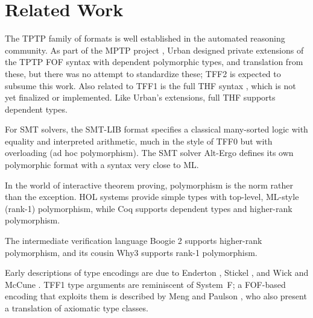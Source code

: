 \section{Related Work}
\label{sec_related}

The TPTP family of formats is well established in the automated reasoning
community. As part of the MPTP project \cite{urban-2006}, Urban designed private
extensions of the TPTP FOF syntax with dependent polymorphic types, and
translation from these, but there was no attempt to standardize these; TFF2 is
expected to subsume this work. Also related to TFF1 is the full THF syntax
\cite{sutcliffe-benzmueller-2010}, which is not yet finalized or implemented.
Like Urban's extensions, full THF supports dependent types.

For SMT solvers, the SMT-LIB format \cite{barrett-et-al-2010}
specifies a classical many-sorted logic with equality and interpreted
arithmetic, much in the style of TFF0 but with overloading (ad hoc
polymorphism). The SMT solver Alt-Ergo \cite{bobot-et-al-2008} defines its own
polymorphic format with a syntax very close to ML.

In the world of interactive theorem proving, polymorphism is the norm rather
than the exception. HOL systems \cite{gordon-melham-1993} provide simple types
with top-level, ML-style (rank-1) polymorphism, while Coq
\cite{bertot-casteran-2004} supports dependent types and higher-rank
polymorphism.

The intermediate verification language Boogie 2 \cite{leino-ruemmer-2010}
supports higher-rank polymorphism, and its cousin Why3 \cite{bobot-et-al-2011}
supports rank-1 polymorphism.%

Early descriptions of type encodings are due to Enderton
\cite[\S4.3]{enderton-1972}, Stickel \cite[p.~99]{stickel-1986}, and Wick and
McCune \cite[\S4]{wick-mccune-1989}. TFF1 type arguments are reminiscent of
System~F; a FOF-based encoding that exploits them is described by Meng and
Paulson \cite{meng-paulson-2008-trans}, who also present a translation of
axiomatic type classes.

